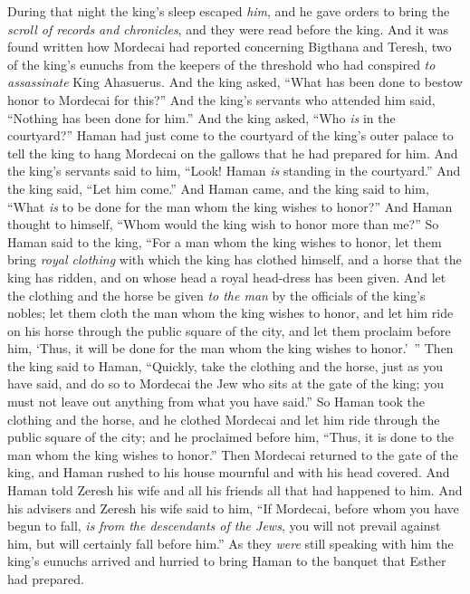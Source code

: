\begin{biblechapter} %
 During that night the king’s sleep escaped \textit{him}, and he gave orders to bring the \textit{scroll of records and chronicles}, and they were read before the king.
\verse And it was found written how Mordecai had reported concerning Bigthana and Teresh, two of the king’s eunuchs from the keepers of the threshold who had conspired \textit{to assassinate} King Ahasuerus.
\verse And the king asked, “What has been done to bestow honor to Mordecai for this?” And the king’s servants who attended him said, “Nothing has been done for him.”
\verse And the king asked, “Who \textit{is} in the courtyard?” Haman had just come to the courtyard of the king’s outer palace to tell the king to hang Mordecai on the gallows that he had prepared for him.
\verse And the king’s servants said to him, “Look! Haman \textit{is} standing in the courtyard.” And the king said, “Let him come.”
\verse And Haman came, and the king said to him, “What \textit{is} to be done for the man whom the king wishes to honor?” And Haman thought to himself, “Whom would the king wish to honor more than me?”
\verse So Haman said to the king, “For a man whom the king wishes to honor,
\verse let them bring \textit{royal clothing} with which the king has clothed himself, and a horse that the king has ridden, and on whose head a royal head-dress has been given.
\verse And let the clothing and the horse be given \textit{to the man} by the officials of the king’s nobles; let them cloth the man whom the king wishes to honor, and let him ride on his horse through the public square of the city, and let them proclaim before him, ‘Thus, it will be done for the man whom the king wishes to honor.’ ”
\verse Then the king said to Haman, “Quickly, take the clothing and the horse, just as you have said, and do so to Mordecai the Jew who sits at the gate of the king; you must not leave out anything from what you have said.”
\verse So Haman took the clothing and the horse, and he clothed Mordecai and let him ride through the public square of the city; and he proclaimed before him, “Thus, it is done to the man whom the king wishes to honor.”
\verse Then Mordecai returned to the gate of the king, and Haman rushed to his house mournful and with his head covered.
\verse And Haman told Zeresh his wife and all his friends all that had happened to him. And his advisers and Zeresh his wife said to him, “If Mordecai, before whom you have begun to fall, \textit{is} \textit{from the descendants of the Jews}, you will not prevail against him, but will certainly fall before him.”
\verse As they \textit{were} still speaking with him the king’s eunuchs arrived and hurried to bring Haman to the banquet that Esther had prepared.
\end{biblechapter}

